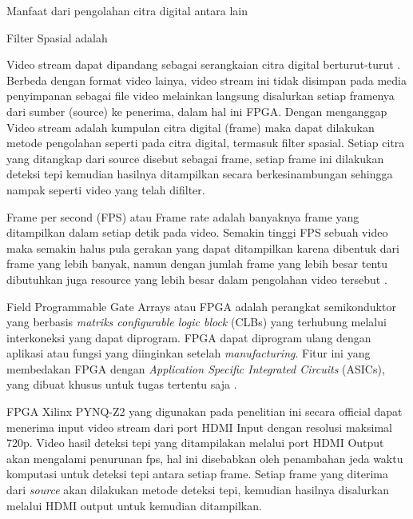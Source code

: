 Manfaat dari pengolahan citra digital antara lain

Filter Spasial adalah

Video stream dapat dipandang sebagai serangkaian citra digital berturut-turut . Berbeda dengan format video lainya, video stream ini tidak disimpan pada media penyimpanan sebagai file video melainkan langsung disalurkan setiap framenya dari sumber (source) ke penerima, dalam hal ini FPGA.  Dengan menganggap Video stream adalah kumpulan citra digital (frame) maka dapat dilakukan metode pengolahan seperti pada citra digital, termasuk filter spasial. Setiap citra yang ditangkap dari source disebut sebagai frame, setiap frame ini dilakukan deteksi tepi kemudian hasilnya ditampilkan secara berkesinambungan sehingga nampak seperti video yang telah difilter. 

Frame per second (FPS) atau Frame rate adalah banyaknya frame yang ditampilkan dalam setiap detik pada video. Semakin tinggi FPS sebuah video maka semakin halus pula gerakan yang dapat ditampilkan karena dibentuk dari frame yang lebih banyak, namun dengan jumlah frame yang lebih besar tentu dibutuhkan juga resource yang lebih besar dalam pengolahan video tersebut . 


Field Programmable Gate Arrays atau FPGA adalah perangkat semikonduktor yang berbasis \textit{matriks configurable logic block} (CLBs) yang terhubung melalui interkoneksi yang dapat diprogram. FPGA dapat diprogram ulang dengan aplikasi atau fungsi yang diinginkan setelah \textit{manufacturing}. Fitur ini yang membedakan FPGA dengan \textit{Application Specific Integrated Circuits} (ASICs), yang dibuat khusus untuk tugas tertentu saja .

FPGA Xilinx PYNQ-Z2 yang digunakan pada penelitian ini secara official dapat menerima input video stream dari port HDMI Input dengan resolusi maksimal 720p. Video hasil deteksi tepi yang ditampilakan melalui port HDMI Output akan mengalami penurunan fps, hal ini disebabkan oleh penambahan jeda waktu komputasi untuk deteksi tepi antara setiap frame. Setiap frame yang diterima dari \textit{source} akan dilakukan metode deteksi tepi, kemudian hasilnya disalurkan melalui HDMI output untuk kemudian ditampilkan.




